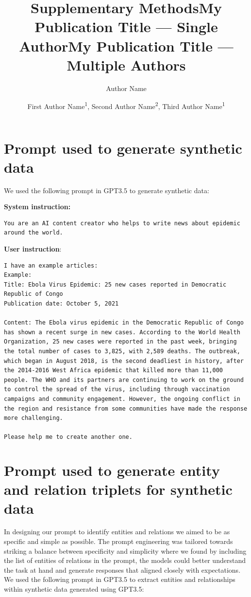 \documentclass[letterpaper]{article} %
\title{Supplementary Methods}
\title{My Publication Title --- Single Author}
\author {
    Author Name
}
\title{My Publication Title --- Multiple Authors}
\author {
    First Author Name\textsuperscript{\rm 1},
    Second Author Name\textsuperscript{\rm 2},
    Third Author Name\textsuperscript{\rm 1}
}
\begin{document}
\maketitle


\section{Prompt used to generate synthetic data}

We used the following prompt in GPT3.5 to generate synthetic data:

\textbf{System instruction:} 
\begin{lstlisting}
You are an AI content creator who helps to write news about epidemic around the world.
\end{lstlisting}

\textbf{User instruction}:  
\begin{lstlisting}
I have an example articles:
Example:
Title: Ebola Virus Epidemic: 25 new cases reported in Democratic Republic of Congo
Publication date: October 5, 2021

Content: The Ebola virus epidemic in the Democratic Republic of Congo has shown a recent surge in new cases. According to the World Health Organization, 25 new cases were reported in the past week, bringing the total number of cases to 3,825, with 2,589 deaths. The outbreak, which began in August 2018, is the second deadliest in history, after the 2014-2016 West Africa epidemic that killed more than 11,000 people. The WHO and its partners are continuing to work on the ground to control the spread of the virus, including through vaccination campaigns and community engagement. However, the ongoing conflict in the region and resistance from some communities have made the response more challenging.

Please help me to create another one. 
\end{lstlisting}


\section{Prompt used to generate entity and relation triplets for synthetic data}

In designing our prompt to identify entities and relations we aimed to be as specific and simple as possible. The prompt engineering was tailored towards striking a balance between specificity and simplicity where we found by including the list of entities of relations in the prompt, the models could better understand the task at hand and generate responses that aligned closely with expectations. We used the following prompt in GPT3.5 to extract entities and relationships within synthetic data generated using GPT3.5:
\end{document}
